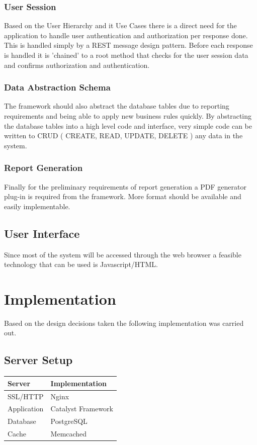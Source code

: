 \documentclass{journal}
\begin{document}
\subsubsection{User Session}

Based on the User Hierarchy and it Use Cases there is a direct need for the application to handle user authentication and authorization per response done. This is handled simply by a REST message design pattern. Before each response is handled it is 'chained' to a root method that checks for the user session data and confirms authorization and authentication.  

\subsubsection{Data Abstraction Schema}

The framework should also abstract the database tables due to reporting requirements and being able to apply new business rules quickly. By abstracting the database tables into a high level code and interface, very simple code can be written to CRUD ( CREATE, READ, UPDATE, DELETE ) any data in the system. 

\subsubsection{Report Generation}
Finally for the preliminary requirements of report generation a PDF generator plug-in is required from the framework. More format should be available and easily implementable. 

\subsection{User Interface}
Since most of the system will be accessed through the web browser a feasible technology that can be used is Javascript/HTML.  

\section{Implementation}
Based on the design decisions taken the following implementation was carried out. 

\subsection{Server Setup}

\begin{tabular}{| l | l |}
\hline
Server & Implementation \\
\hline
SSL/HTTP & Nginx \\
Application & Catalyst Framework \\
Database & PostgreSQL \\
Cache & Memcached \\
\hline 
\end{tabular}
\end{document}
